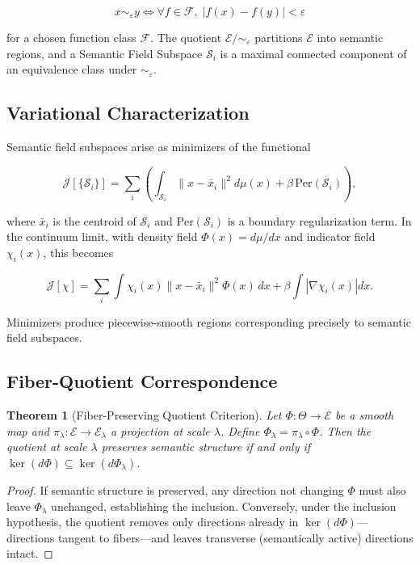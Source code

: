 \documentclass[11pt, twoside]{article}
\theoremstyle{plain}
\newtheorem{theorem}{Theorem}[section]
\theoremstyle{definition}
\theoremstyle{remark}
\begin{document}
\[
x \sim_\varepsilon y \iff \forall f \in \mathcal{F},\; |f(x) - f(y)| < \varepsilon
\]

for a chosen function class $\mathcal{F}$. The quotient $\mathcal{E} / {\sim_\varepsilon}$ partitions $\mathcal{E}$ into semantic regions, and a Semantic Field Subspace $\mathcal{S}_i$ is a maximal connected component of an equivalence class under $\sim_\varepsilon$.

\subsection{Variational Characterization}

Semantic field subspaces arise as minimizers of the functional

\[
\mathcal{J}[\{\mathcal{S}_i\}] = \sum_i \left( \int_{\mathcal{S}_i} \|x - \bar{x}_i\|^2 d\mu(x) + \beta \, \mathrm{Per}(\mathcal{S}_i) \right),
\]

where $\bar{x}_i$ is the centroid of $\mathcal{S}_i$ and $\mathrm{Per}(\mathcal{S}_i)$ is a boundary regularization term. In the continuum limit, with density field $\Phi(x) = d\mu/dx$ and indicator field $\chi_i(x)$, this becomes

\[
\mathcal{J}[\chi] = \sum_i \int \chi_i(x) \|x - \bar{x}_i\|^2 \Phi(x)\, dx + \beta \int |\nabla \chi_i(x)| dx.
\]

Minimizers produce piecewise-smooth regions corresponding precisely to semantic field subspaces.

\subsection{Fiber-Quotient Correspondence}

\begin{theorem}[Fiber-Preserving Quotient Criterion]
Let $\Phi : \Theta \to \mathcal{E}$ be a smooth map and $\pi_\lambda : \mathcal{E} \to \mathcal{E}_\lambda$ a projection at scale $\lambda$. Define $\Phi_\lambda = \pi_\lambda \circ \Phi$. Then the quotient at scale $\lambda$ preserves semantic structure if and only if $\ker(d\Phi) \subseteq \ker(d\Phi_\lambda)$.
\end{theorem}

\begin{proof}
If semantic structure is preserved, any direction not changing $\Phi$ must also leave $\Phi_\lambda$ unchanged, establishing the inclusion. Conversely, under the inclusion hypothesis, the quotient removes only directions already in $\ker(d\Phi)$---directions tangent to fibers---and leaves transverse (semantically active) directions intact.
\end{proof}
\end{document}
